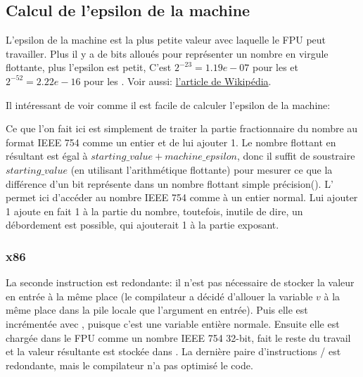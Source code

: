 ﻿\subsection{Calcul de l'epsilon de la machine}

L'epsilon de la machine est la plus petite valeur avec laquelle le \ac{FPU} peut
travailler.
Plus il y a de bits alloués pour représenter un nombre en virgule flottante, plus
l'epsilon est petit,
C'est $2^{-23} = 1.19e-07$ pour les \Tfloat et $2^{-52} = 2.22e-16$ pour les \Tdouble.
Voir aussi: \href{http://link.yurichev.com/17367}{l'article de Wikipédia}.%

Il intéressant de voir comme il est facile de calculer l'epsilon de la machine:



Ce que l'on fait ici est simplement de traiter la partie fractionnaire du nombre
au format IEEE 754 comme un entier et de lui ajouter 1.
Le nombre flottant en résultant est égal à $starting\_value+machine\_epsilon$, donc
il suffit de soustraire $starting\_value$ (en utilisant l'arithmétique flottante)
pour mesurer ce que la différence d'un bit représente dans un nombre flottant simple
précision(\Tfloat).
L'  permet ici d'accéder au nombre IEEE 754 comme à un entier normal.
Lui ajouter 1 ajoute en fait 1 à la partie  du nombre, toutefois,
inutile de dire, un débordement est possible, qui ajouterait 1 à la partie exposant.

\subsubsection{x86}



La seconde instruction  est redondante: il n'est pas nécessaire de stocker
la valeur en entrée à la même place (le compilateur a décidé d'allouer la variable
$v$ à la même place dans la pile locale que l'argument en entrée).
Puis elle est incrémentée avec , puisque c'est une variable entière normale.
Ensuite elle est chargée dans le FPU comme un nombre IEEE 754 32-bit, 
fait le reste du travail et la valeur résultante est stockée dans .
La dernière paire d'instructions / est redondante, mais le compilateur
n'a pas optimisé le code.

